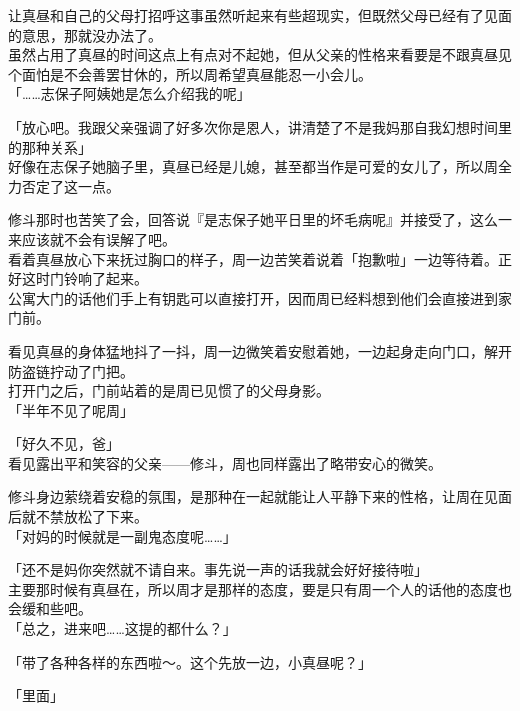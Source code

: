 让真昼和自己的父母打招呼这事虽然听起来有些超现实，但既然父母已经有了见面的意思，那就没办法了。\\

虽然占用了真昼的时间这点上有点对不起她，但从父亲的性格来看要是不跟真昼见个面怕是不会善罢甘休的，所以周希望真昼能忍一小会儿。\\

「……志保子阿姨她是怎么介绍我的呢」

「放心吧。我跟父亲强调了好多次你是恩人，讲清楚了不是我妈那自我幻想时间里的那种关系」\\

好像在志保子她脑子里，真昼已经是儿媳，甚至都当作是可爱的女儿了，所以周全力否定了这一点。

修斗那时也苦笑了会，回答说『是志保子她平日里的坏毛病呢』并接受了，这么一来应该就不会有误解了吧。\\

看着真昼放心下来抚过胸口的样子，周一边苦笑着说着「抱歉啦」一边等待着。正好这时门铃响了起来。\\

公寓大门的话他们手上有钥匙可以直接打开，因而周已经料想到他们会直接进到家门前。

看见真昼的身体猛地抖了一抖，周一边微笑着安慰着她，一边起身走向门口，解开防盗链拧动了门把。\\

打开门之后，门前站着的是周已见惯了的父母身影。\\

「半年不见了呢周」

「好久不见，爸」\\

看见露出平和笑容的父亲——修斗，周也同样露出了略带安心的微笑。

修斗身边萦绕着安稳的氛围，是那种在一起就能让人平静下来的性格，让周在见面后就不禁放松了下来。\\%

「对妈的时候就是一副鬼态度呢……」

「还不是妈你突然就不请自来。事先说一声的话我就会好好接待啦」\\

主要那时候有真昼在，所以周才是那样的态度，要是只有周一个人的话他的态度也会缓和些吧。\\

「总之，进来吧……这提的都什么？」

「带了各种各样的东西啦～。这个先放一边，小真昼呢？」

「里面」\\

